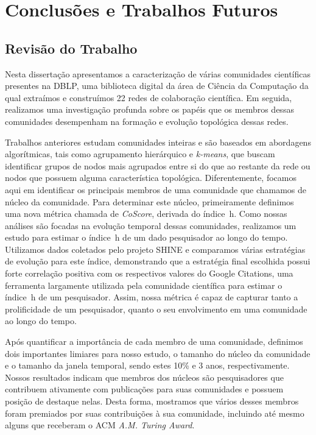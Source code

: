 \chapter{Conclusões e Trabalhos Futuros}\label{conclusao}

\section{Revisão do Trabalho}

Nesta dissertação apresentamos a caracterização de várias comunidades científicas presentes na DBLP, 
uma biblioteca digital da área de Ciência da Computação da qual extraímos e construímos 22 redes 
de colaboração científica. Em seguida, realizamos uma investigação profunda sobre os papéis que os membros 
dessas comunidades desempenham na formação e evolução topológica dessas redes.

Trabalhos anteriores estudam comunidades inteiras e são baseados em abordagens algorítmicas, 
tais como agrupamento hierárquico e \textit{k-means}, que buscam identificar grupos de nodos mais agrupados entre si 
do que ao restante da rede ou nodos que possuem alguma característica topológica. Diferentemente, focamos aqui em identificar os 
principais membros de uma comunidade que chamamos de núcleo da comunidade. Para determinar este núcleo, primeiramente 
definimos uma nova métrica chamada de \textit{CoScore}, derivada do índice~h. Como nossas análises são 
focadas na evolução temporal dessas comunidades, realizamos um estudo para estimar o índice~h de um dado pesquisador ao 
longo do tempo. Utilizamos dados coletados pelo projeto SHINE e comparamos várias estratégias de evolução para este 
índice, demonstrando que a estratégia final escolhida possui forte correlação positiva com os respectivos valores 
do Google Citations, uma ferramenta largamente utilizada pela comunidade 
científica para estimar o índice~h de um pesquisador. Assim, nossa métrica é capaz de capturar 
tanto a prolificidade de um pesquisador, quanto o seu envolvimento em uma comunidade ao longo do tempo. 

Após quantificar a importância de cada membro de uma comunidade, definimos dois importantes limiares 
para nosso estudo, o tamanho do núcleo da comunidade e o tamanho da janela temporal, sendo estes 
10\% e 3 anos, respectivamente. Nossos resultados indicam que membros dos núcleos são 
pesquisadores que contribuem ativamente com publicações para suas comunidades e possuem posição de 
destaque nelas. Desta forma, mostramos que vários desses membros foram premiados por suas contribuições 
à sua comunidade, incluindo até mesmo alguns que receberam o ACM \textit{A.M. Turing Award}.

